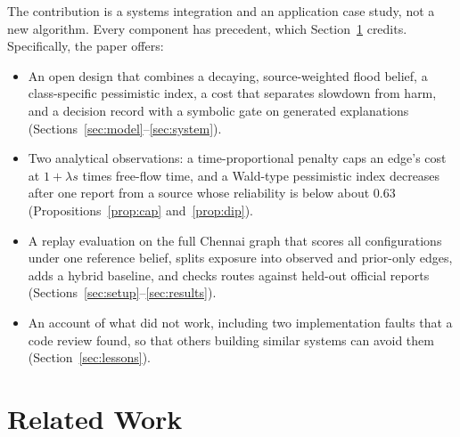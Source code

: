 \documentclass[conference]{IEEEtran}
\begin{document}
The contribution is a systems integration and an application case study, not a new algorithm. Every component has precedent, which Section~\ref{sec:related} credits. Specifically, the paper offers:
\begin{itemize}
\item An open design that combines a decaying, source-weighted flood belief, a class-specific pessimistic index, a cost that separates slowdown from harm, and a decision record with a symbolic gate on generated explanations (Sections~\ref{sec:model}--\ref{sec:system}).
\item Two analytical observations: a time-proportional penalty caps an edge's cost at $1+\lambda s$ times free-flow time, and a Wald-type pessimistic index decreases after one report from a source whose reliability is below about 0.63 (Propositions~\ref{prop:cap} and~\ref{prop:dip}).
\item A replay evaluation on the full Chennai graph that scores all configurations under one reference belief, splits exposure into observed and prior-only edges, adds a hybrid baseline, and checks routes against held-out official reports (Sections~\ref{sec:setup}--\ref{sec:results}).
\item An account of what did not work, including two implementation faults that a code review found, so that others building similar systems can avoid them (Section~\ref{sec:lessons}).
\end{itemize}

\section{Related Work}\label{sec:related}
\end{document}
